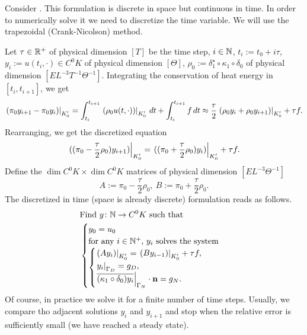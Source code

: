 \begin{discussion}
  Consider .
  This formulation is discrete in space but continuous in time.
  In order to numerically solve it we need to discretize the time variable.
  We will use the trapezoidal (Crank-Nicolson) method.

  Let
    $\tau \in \mathbb{R}^+$ of physical dimension $[T]$ be the time step,
    $i \in \mathbb{N}$,
    $t_i := t_0 + i \tau$,
    $y_i := u(t_i, \cdot) \in C^0 K$ of physical dimension $[\Theta]$,
    $\rho_0 := \delta_1^\star \circ \kappa_1 \circ \delta_0$
      of physical dimension $[E L^{-3} T^{-1} \Theta^{-1}]$.
  Integrating the conservation of heat energy in $[t_i, t_{i + 1}]$, we get
  \begin{equation}
    \left. (\pi_0 y_{i + 1} - \pi_0 y_i) \right|_{K'_0}
    =   \int_{t_i}^{t_{i + 1}} \left. (\rho_0 u(t, \cdot)) \right|_{K'_0}\, d t
      + \int_{t_i}^{t_{i + 1}} f\, d t
    \approx
    \frac{\tau}{2} \left. (\rho_0 y_i + \rho_0 y_{i + 1}) \right|_{K'_0} + \tau f.
  \end{equation}
  Rearranging, we get the discretized equation
  \begin{equation}
    \left. ((\pi_0 - \frac{\tau}{2} \rho_0) y_{i + 1}) \right|_{K'_0}
    = \left. ((\pi_0 + \frac{\tau}{2} \rho_0) y_i) \right|_{K'_0} + \tau f.
  \end{equation}
  Define the $\dim C^0 K \times \dim C^0 K$ matrices of physical dimension
  $[E L^{-3} \Theta^{-1}]$
  \begin{equation}
    A := \pi_0 - \frac{\tau}{2} \rho_0,\ B := \pi_0 + \frac{\tau}{2} \rho_0.
  \end{equation}
  The discretized in time (space is already discrete) formulation reads as
  follows.
  \begin{equation}
    \begin{split}
      & \text{Find $y \colon \mathbb{N} \to C^0 K$ such that} \\
      &
      \begin{cases}
        y_0 = u_0 \\
        \text{for any $i \in \mathbb{N}^+$, $y_i$ solves the system} \\
        \begin{cases}
          \left. (A y_i) \right|_{K'_0} = \left. (B y_{i - 1}) \right|_{K'_0} + \tau f, \\
          \left. y_i \right|_{\Gamma_D} = g_D, \\
          \left. \overline{(\kappa_1 \circ \delta_0) y_i} \right|_{\Gamma_N}
            \cdot {\bf n} = g_N.
        \end{cases}
      \end{cases}
    \end{split}
  \end{equation}
  Of course, in practice we solve it for a finite number of time steps.
  Usually, we compare tho adjacent solutions $y_i$ and $y_{i + 1}$ and stop when
  the relative error is sufficiently small (we have reached a steady state).
\end{discussion}
